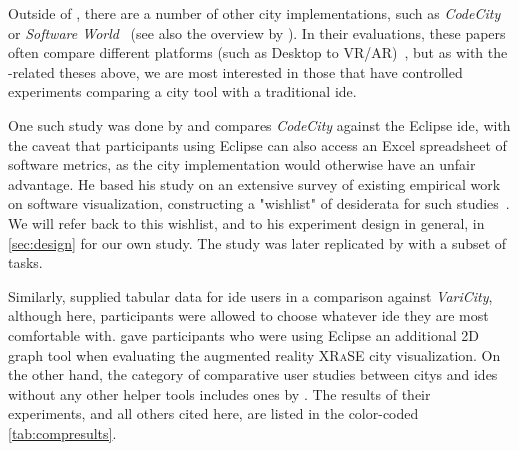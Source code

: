 \documentclass[../thesis]{subfiles}
\begin{document}
Outside of \SEE{}, there are a number of other \gls{city} implementations, such as \emph{CodeCity}~\cite{wettel2007} or \emph{Software World}~\cite{knight2000} (see also the overview by \textcite{jeffery2019}).
In their evaluations, these papers often compare different platforms (such as Desktop to VR/AR)~\cite[\eg,][]{merino2017,fittkau2015, merino2018}, but as with the \SEE{}-related theses above, we are most interested in those that have controlled experiments comparing a \gls{city} tool with a traditional \gls{ide}.

One such study was done by \textcite{wettel2011} and compares \emph{CodeCity} against the Eclipse \gls{ide}, with the caveat that participants using Eclipse can also access an Excel spreadsheet of software metrics, as the \gls{city} implementation would otherwise have an unfair advantage.
He based his study on an extensive survey of existing empirical work on software visualization, constructing a "wishlist" of desiderata for such studies~\cite[chapter 7]{wettel2011}.
We will refer back to this wishlist, and to his experiment design in general, in \cref{sec:design} for our own study.
The study was later replicated by \textcite{romano2019} with a subset of tasks.

Similarly, \textcite{mortara2024} supplied tabular data for \gls{ide} users in a comparison against \emph{VariCity}, although here, participants were allowed to choose whatever \gls{ide} they are most comfortable with.
\textcite{mehra2020} gave participants who were using Eclipse an additional 2D graph tool when evaluating the augmented reality \textsc{XRaSE} \gls{city} visualization.
On the other hand, the category of comparative user studies between \glspl{city} and \glspl{ide} without any other helper tools includes ones by \textcite{khaloo2017,galperin2022,lennartkipka2020}.
The results of their experiments, and all others cited here, are listed in the color-coded \cref{tab:compresults}.



\newcommand{\reside}[1]{\cellcolor{Blue}\textcolor{White}{#1}}
\newcommand{\rescc}[1]{\cellcolor{Maroon}\textcolor{White}{#1}}
\newcommand{\residel}[1]{\cellcolor{LightBlue}#1}  %
\newcommand{\resccl}[1]{\cellcolor{LightMaroon}#1}
\newcommand{\resmixed}[1]{\cellcolor{Goldenrod}#1}  %
\newcommand{\resnone}[1]{\cellcolor{Gray!70!white}No diff.}  %
\newcommand{\resna}[1]{\textcolor{Gray}{\textit{N/A}}}
\end{document}
